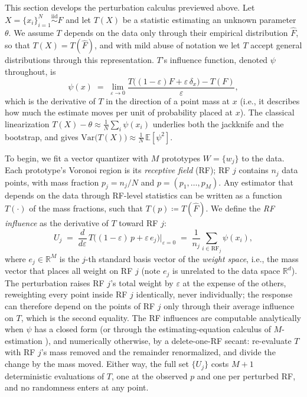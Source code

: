 \documentclass[runningheads]{llncs}
\newcommand{\ifl}{\psi}
\newcommand{\Fhat}{\hat F}
\begin{document}
This section develops the perturbation calculus previewed above. Let $X = \{x_i\}_{i=1}^N \stackrel{\mathrm{iid}}{\sim} F$ and let $T(X)$ be a statistic estimating an unknown parameter $\theta$. We assume $T$ depends on the data only through their empirical distribution $\Fhat$, so that $T(X) = T(\Fhat)$, and with mild abuse of notation we let $T$ accept general distributions through this representation. $T$'s influence function, denoted $\ifl$ throughout, is
\begin{equation}
\ifl(x) \;=\; \lim_{\varepsilon \to 0}\frac{T\bigl((1-\varepsilon)F + \varepsilon\,\delta_x\bigr) - T(F)}{\varepsilon},
\end{equation}
which is the derivative of $T$ in the direction of a point mass at $x$ (i.e., it describes how much the estimate moves per unit of probability placed at $x$). The classical linearization $T(X) - \theta \approx \tfrac1N\sum_i \ifl(x_i)$ \cite{vonmises1947,hampel1974} underlies both the jackknife and the bootstrap, and gives $\mathrm{Var}\bigl(T(X)\bigr) \approx \tfrac1N\,\mathbb{E}[\ifl^2]$.

To begin, we fit a vector quantizer with $M$ prototypes $W = \{w_j\}$ to the data. Each prototype's Voronoi region is its \emph{receptive field} (RF); RF $j$ contains $n_j$ data points, with mass fraction $p_j = n_j/N$ and $p = (p_1,\dots,p_M)$. Any estimator that depends on the data through RF-level statistics can be written as a function $T(\cdot)$ of the mass fractions, such that $T(p) \coloneq T(\Fhat)$. We define the \emph{RF influence} as the derivative of $T$ toward RF $j$:
\begin{equation}\label{eq:Uj}
U_j \;=\; \frac{d}{d\varepsilon}\,T\bigl((1-\varepsilon)\,p + \varepsilon\, e_j\bigr)\Big|_{\varepsilon = 0}
\;=\; \frac{1}{n_j}\sum_{i \in \mathrm{RF}_j} \ifl(x_i),
\end{equation}
where $e_j \in \mathbb{R}^M$ is the $j$-th standard basis vector of the \emph{weight space}, i.e., the mass vector that places all weight on RF $j$ (note $e_j$ is unrelated to the data space $\mathbb{R}^d$). The perturbation raises RF $j$'s total weight by $\varepsilon$ at the expense of the others, reweighting every point inside RF $j$ identically, never individually; the response can therefore depend on the points of RF $j$ only through their average influence on $T$, which is the second equality. The RF influences are computable analytically when $\ifl$ has a closed form (or through the estimating-equation calculus of $M$-estimation \cite{stefanski2002}), and numerically otherwise, by a delete-one-RF secant: re-evaluate $T$ with RF $j$'s mass removed and the remainder renormalized, and divide the change by the mass moved. Either way, the full set $\{U_j\}$ costs $M{+}1$ deterministic evaluations of $T$, one at the observed $p$ and one per perturbed RF, and no randomness enters at any point.
\end{document}
